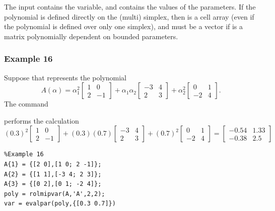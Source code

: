 \documentclass[english,11pt]{article}
\theoremstyle{break} \theorembodyfont{\small\rm}
\begin{document}
The input  contains the  variable, and  contains
the values of the parameters. If the polynomial is defined directly on the (multi) simplex,
then  is a cell array (even if the polynomial is defined over only one simplex),
and  must be a vector if  is a matrix polynomially dependent on
bounded parameters.

\subsubsection*{Example 16}

Suppose that  represents the polynomial
\[
 A(\alpha) = \alpha_1^2 \begin{bmatrix} 1 & 0 \\ 2 & -1 \end{bmatrix} +
 \alpha_1\alpha_2 \begin{bmatrix} -3 & 4 \\ 2 & 3 \end{bmatrix} + 
 \alpha_2^2 \begin{bmatrix} 0 & 1 \\ -2 & 4 \end{bmatrix}.
\]
The command

\vspace{0.5cm}%
\begin{minipage}{8.5cm}
\end{minipage}
\vspace{0.2cm}

\noindent performs the calculation
\[
 (0.3)^2 \begin{bmatrix} 1 & 0 \\ 2 & -1 \end{bmatrix} +
 (0.3)(0.7) \begin{bmatrix} -3 & 4 \\ 2 & 3 \end{bmatrix} + 
 (0.7)^2 \begin{bmatrix} 0 & 1 \\ -2 & 4 \end{bmatrix} =
 \begin{bmatrix} -0.54 & 1.33 \\ -0.38 & 2.5 \end{bmatrix}
\]


\begin{minipage}{7.5cm}
 \begin{lstlisting}
%Example 16
A{1} = {[2 0],[1 0; 2 -1]};
A{2} = {[1 1],[-3 4; 2 3]};
A{3} = {[0 2],[0 1; -2 4]};
poly = rolmipvar(A,'A',2,2);
var = evalpar(poly,{[0.3 0.7]})
 \end{lstlisting}
\end{minipage}
\vspace{0.2cm}
\end{document}

